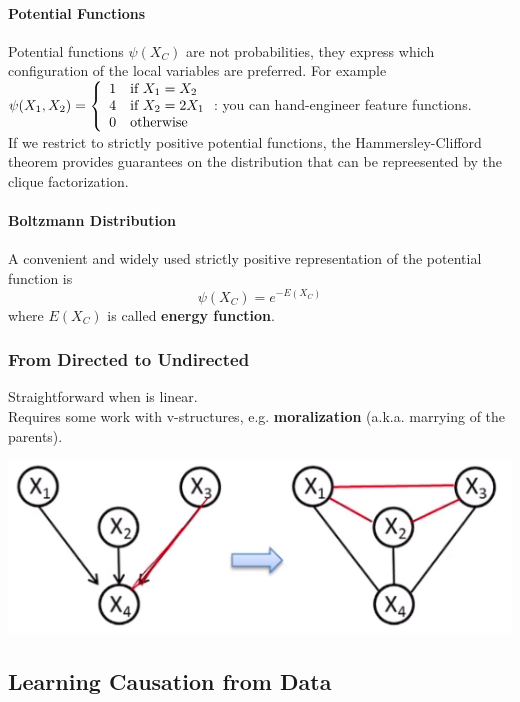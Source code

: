 \documentclass[10pt]{report}
\begin{document}
\paragraph{Potential Functions} Potential functions $\psi(X_C)$ are not probabilities, they express which configuration of the local variables are preferred. For example $\psi(X_1,X_2)=\left\{ \begin{array}{l l}
1&\hbox{if }X_1 = X_2\\
4&\hbox{if }X_2 = 2X_1\\
0&\hbox{otherwise}
\end{array}\right.$: you can hand-engineer feature functions.\\
If we restrict to strictly positive potential functions, the Hammersley-Clifford theorem provides guarantees on the distribution that can be repreesented by the clique factorization.
\paragraph{Boltzmann Distribution} A convenient and widely used strictly positive representation of the potential function is $$\psi(X_C)=e^{-E(X_C)}$$
where $E(X_C)$ is called \textbf{energy function}.
\subsubsection{From Directed to Undirected}
Straightforward when is linear.\\Requires some work with v-structures, e.g. \textbf{moralization} (a.k.a. marrying of the parents).\begin{center}
	\includegraphics[scale=0.5]{25.png}
\end{center}
\subsection{Learning Causation from Data}
\end{document}
